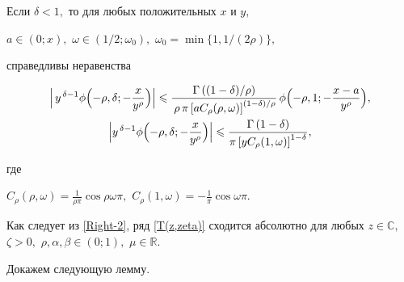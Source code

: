 \smallskip



\begin{lemma}[2]Если $\delta<1,$ то для любых положительных $x$ и $y,$ 

$a\in(0;x),$ $\omega\in(1/2; \omega_0),$ $\omega_0=\min\{1,1/(2\rho)\},$

справедливы неравенства~{\rm \cite[с.~49]{Pskhu}}

\begin{gather}\label{Right-0}

\Bigl|\,y^{\,\delta-1}\phi\Bigl(-\rho,\delta;-\frac{x}{y^{\rho}}\Bigr)\Bigr|

\leqslant 

\frac{\Gamma\left( (1-\delta)/\rho\right)}{\,\rho\, \pi \left[aC_{\rho}(\rho,\omega) \right]^{(1-\delta)/\rho}}\,

\phi\Bigl(-\rho,1;-\frac{x-a}{y^{\rho}}\Bigr),

\\

\label{Right-2}

\Bigl|y^{\,\delta-1}\phi\Bigl(-\rho,\delta;-\frac{x}{y^{\rho}}\Bigr)\Bigr|

\leqslant \frac{\Gamma\left( 1-\delta\right)}{\pi \left[yC_{\rho}(1,\omega) \right]^{1-\delta}},

\end{gather}

где 

$C_{\rho}(\rho,\omega)=\frac1{\rho\pi}{\cos \rho\omega\pi},$ $C_{\rho}(1,\omega)=-\frac1{\pi}{\cos \omega\pi}.

$

\end{lemma}



\smallskip



Как следует из \eqref{Right-2}, ряд \eqref{T(z,zeta)} сходится абсолютно для любых  $z\in\mathbb{C},$ $\zeta>0,$ $\rho, \alpha, \beta\in(0;1),$ $\mu\in\mathbb{R}.$



\smallskip



Докажем следующую лемму.



\smallskip

